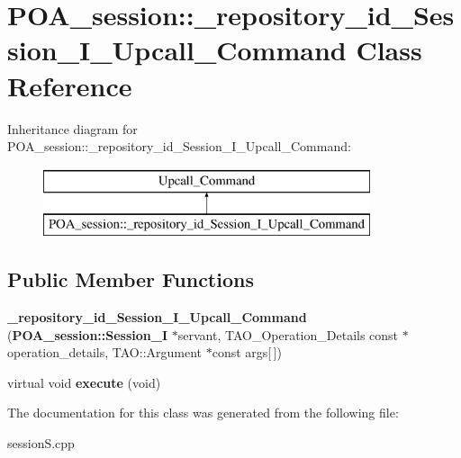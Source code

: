 \section{P\+O\+A\+\_\+session\+:\+:\+\_\+repository\+\_\+id\+\_\+\+Session\+\_\+\+I\+\_\+\+Upcall\+\_\+\+Command Class Reference}
\label{classPOA__session_1_1__repository__id__Session__I__Upcall__Command}
Inheritance diagram for P\+O\+A\+\_\+session\+:\+:\+\_\+repository\+\_\+id\+\_\+\+Session\+\_\+\+I\+\_\+\+Upcall\+\_\+\+Command\+:\begin{figure}[H]
\begin{center}
\leavevmode
\includegraphics[height=2.000000cm]{classPOA__session_1_1__repository__id__Session__I__Upcall__Command}
\end{center}
\end{figure}
\subsection*{Public Member Functions}
\begin{DoxyCompactItemize}
\item 
{\bfseries \+\_\+repository\+\_\+id\+\_\+\+Session\+\_\+\+I\+\_\+\+Upcall\+\_\+\+Command} ({\bf P\+O\+A\+\_\+session\+::\+Session\+\_\+I} $\ast$servant, T\+A\+O\+\_\+\+Operation\+\_\+\+Details const $\ast$operation\+\_\+details, T\+A\+O\+::\+Argument $\ast$const args[$\,$])\label{classPOA__session_1_1__repository__id__Session__I__Upcall__Command_a797d296646431601bc72c62b6653cc65}

\item 
virtual void {\bfseries execute} (void)\label{classPOA__session_1_1__repository__id__Session__I__Upcall__Command_a5a1b5874d73387bbb6513927ff6008ac}

\end{DoxyCompactItemize}


The documentation for this class was generated from the following file\+:\begin{DoxyCompactItemize}
\item 
session\+S.\+cpp\end{DoxyCompactItemize}
